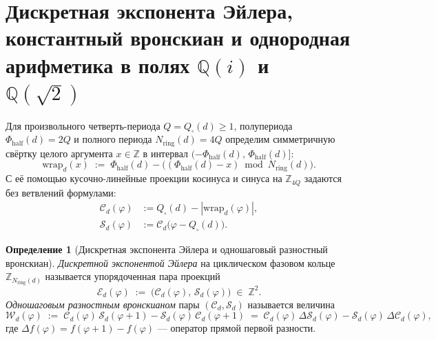 \documentclass[11pt,a4paper]{article}
\theoremstyle{plain}
\theoremstyle{definition}
\newtheorem{definition}[theorem]{Определение}
\begin{document}
\section{Дискретная экспонента Эйлера, константный вронскиан и однородная арифметика в полях \texorpdfstring{$\mathbb{Q}(i)$ и $\mathbb{Q}(\sqrt{2})$}{Q(i) and Q(sqrt 2)}}
\label{sec:wronskian-euler}

Для произвольного четверть-периода $Q = Q_\square(d) \ge 1$, полупериода $\Phi_{\mathrm{half}}(d) = 2Q$ и полного периода $N_{\mathrm{ring}}(d) = 4Q$ определим симметричную свёртку целого аргумента $x \in \mathbb{Z}$ в интервал $(-\Phi_{\mathrm{half}}(d),\, \Phi_{\mathrm{half}}(d)]$:
\begin{equation}
  \label{eq:wrap-ring}
  \mathrm{wrap}_d(x) \;:=\; \Phi_{\mathrm{half}}(d) - \bigl((\Phi_{\mathrm{half}}(d) - x) \bmod N_{\mathrm{ring}}(d)\bigr).
\end{equation}
С её помощью кусочно-линейные проекции косинуса и синуса на $\mathbb{Z}_{4Q}$ задаются без ветвлений формулами:
\begin{align}
  \mathcal{C}_d(\varphi) &:= Q_\square(d) - |\mathrm{wrap}_d(\varphi)|, \label{eq:proj-c} \\
  \mathcal{S}_d(\varphi) &:= \mathcal{C}_d\bigl(\varphi - Q_\square(d)\bigr). \label{eq:proj-s}
\end{align}

\begin{definition}[Дискретная экспонента Эйлера и одношаговый разностный вронскиан]
\label{def:euler-exp-wronskian}
\emph{Дискретной экспонентой Эйлера} на циклическом фазовом кольце $\mathbb{Z}_{N_{\mathrm{ring}}(d)}$ называется упорядоченная пара проекций
\begin{equation}
  \label{eq:euler-exp-pair}
  \mathcal{E}_d(\varphi) \;:=\; \bigl(\mathcal{C}_d(\varphi),\, \mathcal{S}_d(\varphi)\bigr) \;\in\; \mathbb{Z}^2.
\end{equation}
\emph{Одношаговым разностным вронскианом} пары $(\mathcal{C}_d, \mathcal{S}_d)$ называется величина
\begin{equation}
  \label{eq:rotator-wronskian}
  \mathcal{W}_d(\varphi) \;:=\; \mathcal{C}_d(\varphi)\,\mathcal{S}_d(\varphi+1) - \mathcal{S}_d(\varphi)\,\mathcal{C}_d(\varphi+1)
  \;=\; \mathcal{C}_d(\varphi)\,\Delta\mathcal{S}_d(\varphi) - \mathcal{S}_d(\varphi)\,\Delta\mathcal{C}_d(\varphi),
\end{equation}
где $\Delta f(\varphi) = f(\varphi+1) - f(\varphi)$ --- оператор прямой первой разности.
\end{definition}
\end{document}
